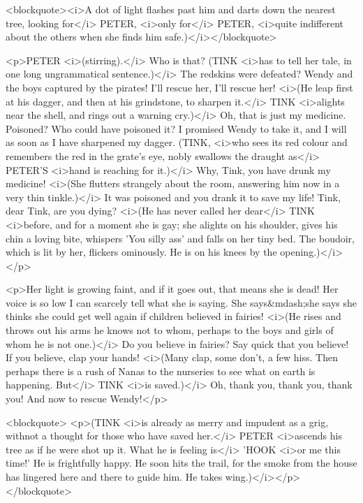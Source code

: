 <blockquote><i>A dot of light flashes past him and darts down the nearest tree, looking for</i> PETER, <i>only for</i> PETER, <i>quite indifferent about the others when she finds him safe.)</i></blockquote>

<p>PETER <i>(stirring).</i> Who is that? (TINK <i>has to tell her tale, in one long ungrammatical sentence.)</i> The redskins were defeated? Wendy and the boys captured by the pirates! I'll rescue her, I'll rescue her! <i>(He leap first at his dagger, and then at his grindstone, to sharpen it.</i> TINK <i>alights near the shell, and rings out a warning cry.)</i> Oh, that is just my medicine. Poisoned? Who could have poisoned it? I promised Wendy to take it, and I will as soon as I have sharpened my dagger. (TINK, <i>who sees its red colour and remembers the red in the grate's eye, nobly swallows the draught as</i> PETER'S <i>hand is reaching for it.)</i> Why, Tink, you have drunk my medicine! <i>(She flutters strangely about the room, answering him now in a very thin tinkle.)</i> It was poisoned and you drank it to save my life! Tink, dear Tink, are you dying? <i>(He has never called her dear</i> TINK <i>before, and for a moment she is gay; she alights on his shoulder, gives his chin a loving bite, whispers 'You silly ass' and falls on her tiny bed. The boudoir, which is lit by her, flickers ominously. He is on his knees by the opening.)</i></p>

<p>Her light is growing faint, and if it goes out, that means she is dead! Her voice is so low I can scarcely tell what she is saying. She says&mdash;she says she thinks she could get well again if children believed in fairies! <i>(He rises and throws out his arms he knows not to whom, perhaps to the boys and girls of whom he is not one.)</i> Do you believe in fairies? Say quick that you believe! If you believe, clap your hands! <i>(Many clap, some don't, a few hiss. Then perhaps there is a rush of Nanas to the nurseries to see what on earth is happening. But</i> TINK <i>is saved.)</i> Oh, thank you, thank you, thank you! And now to rescue Wendy!</p>

<blockquote> <p>(TINK <i>is already as merry and impudent as a grig, withnot a thought for those who have saved her.</i> PETER <i>ascends his tree as if he were shot up it. What he is feeling is</i> 'HOOK <i>or me this time!' He is frightfully happy. He soon hits the trail, for the smoke from the house has lingered here and there to guide him. He takes wing.)</i></p> </blockquote>
